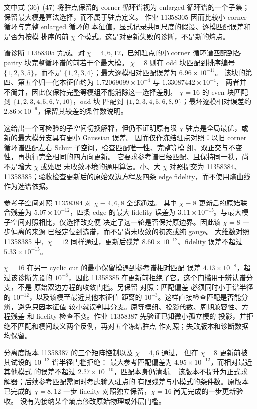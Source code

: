 文中式 (36)--(47) 将驻点保留的 corner 循环谱视为 enlarged
循环谱的一个子集；保留最大模是算法选择，而不属于驻点定义。
作业 11358305 因而比较小 corner 循环与完整 enlarged 循环的
本征值，显式记录共同尺度的假设、逐模匹配误差和是否为按模
排序的前 $\chi$ 个模式。这是对更新失败的诊断，不是新的熵点。


谱诊断 11358305 完成。对 $\chi=4,6,12$，已知驻点的小 corner
循环谱匹配到各 parity 块完整循环谱的前若干个最大模。
$\chi=8$ 则在 odd 块匹配到排序编号 $\{1,2,3,5\}$，而不是
$\{1,2,3,4\}$；最大逐模相对匹配误差为 $6.96\times10^{-11}$。
该块的第四、第五个归一化本征值约为
$1.72069099\times10^{-4}$ 与 $1.33087442\times10^{-4}$，
两者并不简并，因此仅保持完整等模组不能消除这一选择差别。
$\chi=16$ 的 even 块匹配到 $\{1,2,3,4,5,6,7,10\}$，odd 块
匹配到 $\{1,2,3,4,5,6,8,9\}$；最坏逐模相对误差约
$2.86\times10^{-9}$，保留其较差的条件数说明。

这给出一个可检验的子空间切换解释，但仍不证明原有限 $\chi$
驻点是全局最优，或新的最大模分支具有更小 Gaussian 误差。
 因而仅作冻结驻点对照：以旧
corner 循环谱匹配左右 Schur 子空间，检查匹配唯一性、完整等模
组、双正交与不变性，再执行完全相同的四方向更新。
它要求参考谱已经匹配、且保持同一秩，尚不是增大 $\chi$ 或处理
未收敛环境的通用算法。小、大 $\chi$ 对照提交为
11358384、11358385；验收检查更新后的原始双边方程及四条 edge
fidelity，而不使用熵曲线作为选谱依据。


参考子空间对照 11358384 对 $\chi=4,6,8$ 全部通过。
其中 $\chi=8$ 更新后的原始联合残差为
$5.07\times10^{-12}$，四条 edge 的最大 fidelity 误差为
$3.11\times10^{-15}$。与最大模子空间对照相比，仅选择改变便
决定了这一轮是否保持原边界。因此该 $\chi=8$ 一步偏离的来源
已经定位到选谱，而不是尚未收敛的初态或纯 gauge。
大维数对照 11358385 中，$\chi=12$ 同样通过，更新后残差
$8.60\times10^{-12}$、fidelity 误差不超过 $5.33\times10^{-15}$。

$\chi=16$ 在另一 cyclic cut 的最小保留模遇到参考谱相对匹配
误差 $4.13\times10^{-8}$，超过该诊断先设的 $10^{-8}$，因此
11358385 在更新前拒绝了它。这个门槛用于辨认谱分支，不是
原始双边方程的收敛门槛。另保留
 对照：匹配偏差
必须同时小于谱半径的 $10^{-12}$，以及该模至最近其他本征值
距离的 $10^{-3}$。这样直接检查匹配是否能分辨，避免只因本征值
较小就误判其分支。原等模组、投影代数、周期兼容性、方程残差
和 fidelity 检查不变。作业 11358387 先验证已知微小孤立模的
投影，并拒绝不匹配和模间歧义两个反例，再对五个冻结驻点
作对照；失败版本和诊断数据均保留。


分离度版本 11358387 的三个矩阵控制以及 $\chi=4,6$ 通过，
但在 $\chi=8$ 更新前被其试设的 $10^{-12}$ 谱半径门槛拒绝：
最大参考匹配偏差为 $4.95\times10^{-12}$，而相对最近其他模式
的误差不超过 $2.37\times10^{-10}$，匹配本身仍清晰。
该版本不提升为正式求解器；后续参考匹配需同时考虑输入驻点的
有限残差与小模式的条件数。原版本已完成的 $\chi=8,12$ 一步
fidelity 对照独立保留，$\chi=16$ 尚无完成的一步更新验收。
没有为接纳某个熵点修改原始物理或外层门槛。

